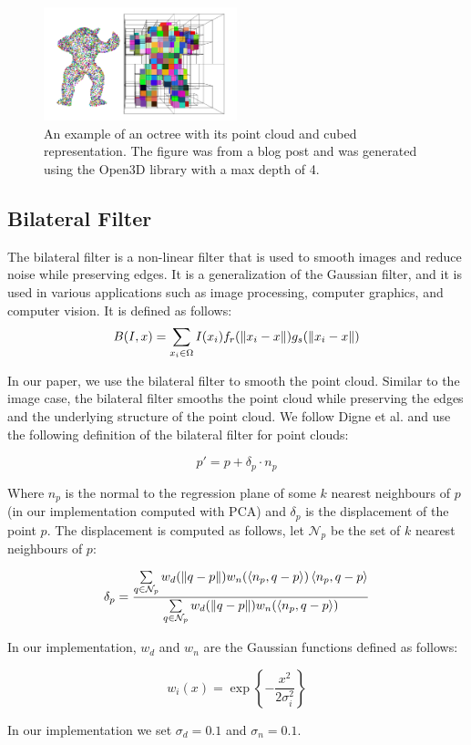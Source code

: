 \begin{figure}[H]
	\centering
	\includegraphics[width=0.5\textwidth]{octree_demo.png}
	\caption{An example of an octree with its point cloud and cubed representation. The figure was from a blog post \cite{octree_demo} and was generated using the Open3D library \cite{open3d} with a max depth of 4.}
	\label{fig:octree_depth}
\end{figure}

\subsection{Bilateral Filter}

The bilateral filter is a non-linear filter that is used to smooth images and reduce noise while preserving edges.
It is a generalization of the Gaussian filter, and it is used in various applications such as image processing, computer graphics, and computer vision.
It is defined as follows:
$$ B(I, x) = \sum\limits_{x_i \in \Omega} I(x_i) f_r(\left\lVert x_i - x\right\rVert)g_s(\left\lVert x_i - x\right\rVert)$$

In our paper, we use the bilateral filter to smooth the point cloud. Similar to the image case, the bilateral filter smooths the point cloud while preserving the edges and the underlying structure of the point cloud.
We follow Digne et al. \cite{3d_bilateral_filter_ipol} and use the following definition of the bilateral filter for point clouds:

\begin{equation} p' = p + \delta_p \cdot n_p\end{equation} 

Where $n_p$ is the normal to the regression plane of some $k$ nearest neighbours of $p$ (in our implementation computed with PCA) and $\delta_p$ is the displacement of the point $p$.
The displacement is computed as follows, let $\mathcal{N}_p$ be the set of $k$ nearest neighbours of $p$:

\begin{equation}\label{eq:delta}  \delta_p = \dfrac{\sum\limits_{q \in \mathcal{N}_p} w_d(\left\lVert q - p\right\rVert)w_n(\left\langle n_p, q-p\right\rangle)\left\langle n_p, q-p\right\rangle}{\sum\limits_{q \in \mathcal{N}_p}w_d(\left\lVert q - p\right\rVert)w_n(\left\langle n_p, q-p\right\rangle)}\end{equation} 

In our implementation, $w_d$ and $w_n$ are the Gaussian functions defined as follows:

\begin{equation} w_i(x) = \exp\left\{-\dfrac{x^2}{2\sigma_i^2}\right\} \label{eq:weight}\end{equation} 

In our implementation we set $\sigma_d = 0.1$ and $\sigma_n = 0.1$.
